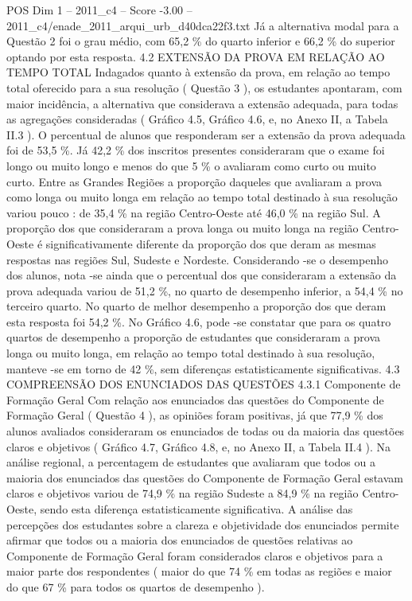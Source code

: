 \begin{textsample}{POS Dim 1 – 2011\_c4 – Score -3.00 – 2011\_c4/enade\_2011\_arqui\_urb\_d40dca22f3.txt}
Já a alternativa modal para a Questão 2 foi o grau médio, com 65,2 \% do quarto inferior e 66,2 \% do superior optando por esta resposta. 4.2 EXTENSÃO DA PROVA EM RELAÇÃO AO TEMPO TOTAL Indagados quanto à extensão da prova, em relação ao tempo total oferecido para a sua resolução ( Questão 3 ), os estudantes apontaram, com maior incidência, a alternativa que considerava a extensão adequada, para todas as agregações consideradas ( Gráfico 4.5, Gráfico 4.6, e, no Anexo II, a Tabela II.3 ).
O percentual de alunos que responderam ser a extensão da prova adequada foi de 53,5 \%.
Já 42,2 \% dos inscritos presentes consideraram que o exame foi longo ou muito longo e menos do que 5 \% o avaliaram como curto ou muito curto.
Entre as Grandes Regiões a proporção daqueles que avaliaram a prova como longa ou muito longa em relação ao tempo total destinado à sua resolução variou pouco : de 35,4 \% na região Centro-Oeste até 46,0 \% na região Sul.
A proporção dos que consideraram a prova longa ou muito longa na região Centro-Oeste é significativamente diferente da proporção dos que deram as mesmas respostas nas regiões Sul, Sudeste e Nordeste.
Considerando -se o desempenho dos alunos, nota -se ainda que o percentual dos que consideraram a extensão da prova adequada variou de 51,2 \%, no quarto de desempenho inferior, a 54,4 \% no terceiro quarto.
No quarto de melhor desempenho a proporção dos que deram esta resposta foi 54,2 \%.
No Gráfico 4.6, pode -se constatar que para os quatro quartos de desempenho a proporção de estudantes que consideraram a prova longa ou muito longa, em relação ao tempo total destinado à sua resolução, manteve -se em torno de 42 \%, sem diferenças estatisticamente significativas. 4.3 COMPREENSÃO DOS ENUNCIADOS DAS QUESTÕES 4.3.1 Componente de Formação Geral Com relação aos enunciados das questões do Componente de Formação Geral ( Questão 4 ), as opiniões foram positivas, já que 77,9 \% dos alunos avaliados consideraram os enunciados de todas ou da maioria das questões claros e objetivos ( Gráfico 4.7, Gráfico 4.8, e, no Anexo II, a Tabela II.4 ).
Na análise regional, a percentagem de estudantes que avaliaram que todos ou a maioria dos enunciados das questões do Componente de Formação Geral estavam claros e objetivos variou de 74,9 \% na região Sudeste a 84,9 \% na região Centro-Oeste, sendo esta diferença estatisticamente significativa.
A análise das percepções dos estudantes sobre a clareza e objetividade dos enunciados permite afirmar que todos ou a maioria dos enunciados de questões relativas ao Componente de Formação Geral foram considerados claros e objetivos para a maior parte dos respondentes ( maior do que 74 \% em todas as regiões e maior do que 67 \% para todos os quartos de desempenho ).

\end{textsample}
